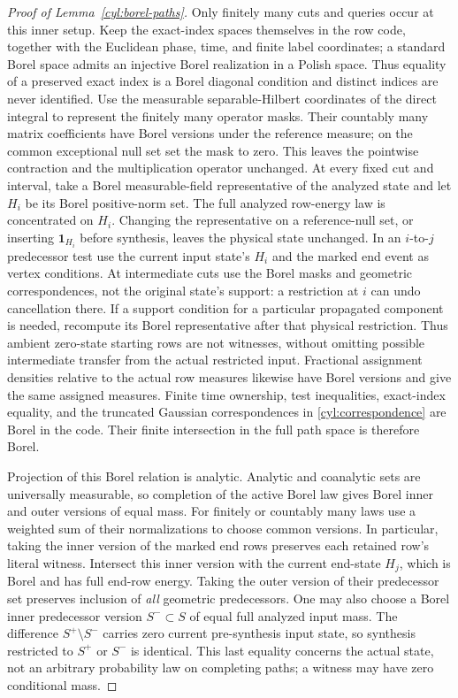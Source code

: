 \begin{proof}[Proof of Lemma~\ref{cyl:borel-paths}]
Only finitely many cuts and queries occur at this inner setup.  Keep
the exact-index spaces themselves in the row code, together with the
Euclidean phase, time, and finite label coordinates; a standard Borel
space admits an injective Borel realization in a Polish space.  Thus
equality of a preserved exact index is a Borel diagonal condition and
distinct indices are never identified.  Use the measurable
separable-Hilbert coordinates of the direct integral to represent
the finitely many operator masks.  Their countably many matrix
coefficients have Borel versions under the reference measure; on the
common exceptional null set set the mask to zero.  This leaves the
pointwise contraction and the multiplication operator unchanged.
At every fixed cut and interval, take a Borel measurable-field
representative of the analyzed state and let $H_i$ be its Borel
positive-norm set. The full analyzed row-energy law is concentrated
on $H_i$. Changing the representative on a reference-null set, or
inserting $\mathbf1_{H_i}$ before synthesis, leaves the physical state
unchanged. In an $i$-to-$j$ predecessor test use the current input
state's $H_i$ and the marked end event as vertex conditions. At
intermediate cuts use the Borel masks and geometric correspondences,
not the original state's support: a restriction at $i$ can undo
cancellation there. If a support condition for a particular
propagated component is needed, recompute its Borel representative
after that physical restriction. Thus ambient zero-state starting
rows are not witnesses, without omitting possible intermediate
transfer from the actual restricted input.
Fractional assignment densities relative to the actual row measures
likewise have Borel versions and give the same assigned measures.
Finite time ownership, test inequalities, exact-index equality, and
the truncated Gaussian correspondences in \eqref{cyl:correspondence}
are Borel in the code.
Their finite intersection in the full path space is therefore Borel.

Projection of this Borel relation is analytic.  Analytic and
coanalytic sets are universally measurable, so completion of the
active Borel law gives Borel inner and outer versions of equal mass.
For finitely or countably many laws use a weighted sum of their
normalizations to choose common versions.  In particular, taking the
inner version of the marked end rows preserves each retained row's
literal witness. Intersect this inner version with the current
end-state $H_j$, which is Borel and has full end-row energy. Taking
the outer version of their predecessor set
preserves inclusion of \emph{all} geometric predecessors.  One may
also choose a Borel inner predecessor version $S^-\subset S$ of equal
full analyzed input mass.  The difference $S^+\setminus S^-$ carries
zero current pre-synthesis input state, so synthesis restricted to
$S^+$ or $S^-$ is identical.
This last equality concerns the actual state, not an arbitrary
probability law on completing paths; a witness may have zero
conditional mass.


\end{proof}

